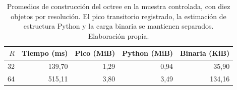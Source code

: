 \begin{table}[htbp]\centering\small
\caption{Promedios de construcción del octree en la muestra controlada, con diez objetos por resolución. El pico transitorio registrado, la estimación de estructura Python y la carga binaria se mantienen separados. Elaboración propia.}\label{tab:construccion-costos}
\begin{tabular}{@{}rrrrr@{}}\toprule
$R$ & Tiempo (ms) & Pico (MiB) & Python (MiB) & Binaria (KiB) \\\midrule
32 & 139,70 & 1,29 & 0,94 & 35,90 \\
64 & 515,11 & 3,80 & 3,49 & 134,16 \\\bottomrule\end{tabular}\end{table}